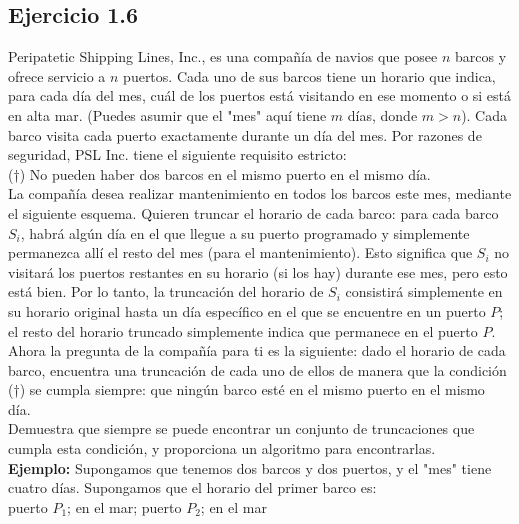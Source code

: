 \documentclass{article}
\begin{document}
\newpage


\subsection{Ejercicio 1.6}

Peripatetic Shipping Lines, Inc., es una compañía de navios que posee $n$ barcos y ofrece servicio a $n$ puertos. Cada uno de sus barcos tiene un horario que indica, para cada día del mes, cuál de los puertos está visitando en ese momento o si está en alta mar. (Puedes asumir que el "mes" aquí tiene $m$ días, donde $m > n$). Cada barco visita cada puerto exactamente durante un día del mes. Por razones de seguridad, PSL Inc. tiene el siguiente requisito estricto:\\

(†) No pueden haber dos barcos en el mismo puerto en el mismo día.\\

La compañía desea realizar mantenimiento en todos los barcos este mes, mediante el siguiente esquema. Quieren truncar el horario de cada barco: para cada barco $S_i$, habrá algún día en el que llegue a su puerto programado y simplemente permanezca allí el resto del mes (para el mantenimiento). Esto significa que $S_i$ no visitará los puertos restantes en su horario (si los hay) durante ese mes, pero esto está bien. Por lo tanto, la truncación del horario de $S_i$ consistirá simplemente en su horario original hasta un día específico en el que se encuentre en un puerto $P$; el resto del horario truncado simplemente indica que permanece en el puerto $P$.\\

Ahora la pregunta de la compañía para ti es la siguiente: dado el horario de cada barco, encuentra una truncación de cada uno de ellos de manera que la condición (†) se cumpla siempre: que ningún barco esté en el mismo puerto en el mismo día.\\

Demuestra que siempre se puede encontrar un conjunto de truncaciones que cumpla esta condición, y proporciona un algoritmo para encontrarlas.\\

\textbf{Ejemplo:} Supongamos que tenemos dos barcos y dos puertos, y el "mes" tiene cuatro días. Supongamos que el horario del primer barco es:\\

puerto $P_1$; en el mar; puerto $P_2$; en el mar\\
\end{document}
